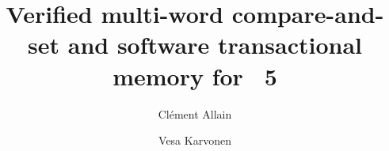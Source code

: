 \documentclass[acmsmall,screen,review,anonymous,nonacm]{acmart}
\begin{document}

\title{Verified multi-word compare-and-set and software transactional memory for \OCaml~5}

\author{Clément Allain}

\author{Vesa Karvonen}

\begin{abstract}
  
\end{abstract}

\maketitle



















\clearpage


\end{document}
